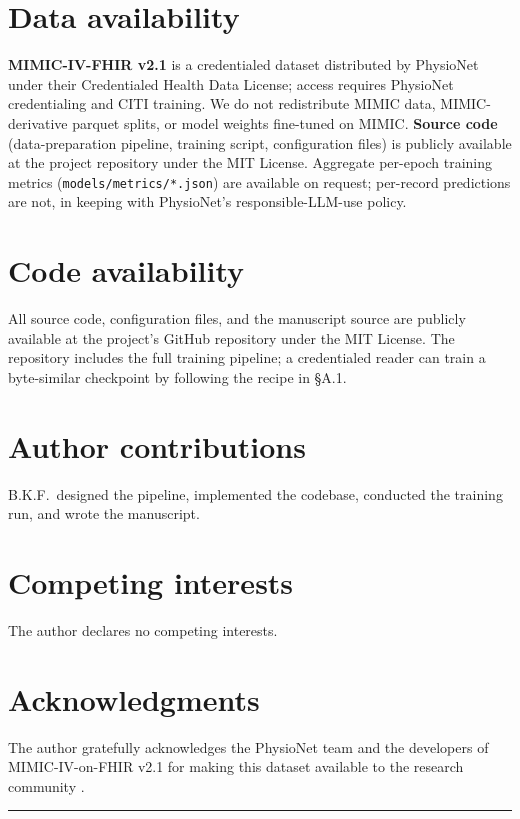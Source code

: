 \documentclass[11pt]{article}
\begin{document}
\section*{Data availability}
\textbf{MIMIC-IV-FHIR v2.1} is a credentialed dataset distributed by
PhysioNet under their Credentialed Health Data License; access
requires PhysioNet credentialing and CITI training. We do not
redistribute MIMIC data, MIMIC-derivative parquet splits, or model
weights fine-tuned on MIMIC. \textbf{Source code} (data-preparation
pipeline, training script, configuration files) is publicly
available at the project repository under the MIT License.
Aggregate per-epoch training metrics
(\texttt{models/metrics/*.json}) are available on request;
per-record predictions are not, in keeping with PhysioNet's
responsible-LLM-use policy.

\section*{Code availability}
All source code, configuration files, and the manuscript source are
publicly available at the project's GitHub repository under the MIT
License. The repository includes the full training pipeline; a
credentialed reader can train a byte-similar checkpoint by
following the recipe in §A.1.

\section*{Author contributions}
B.K.F.\ designed the pipeline, implemented the codebase, conducted
the training run, and wrote the manuscript.

\section*{Competing interests}
The author declares no competing interests.

\section*{Acknowledgments}
The author gratefully acknowledges the PhysioNet team and the
developers of MIMIC-IV-on-FHIR v2.1 for making this dataset
available to the research community
\autocite{Bennett2024,Bennett2023,Johnson2023,Goldberger2000}.

\bigskip
\hrule
\bigskip

\printbibliography[heading=bibintoc, title={References}]
\end{document}

